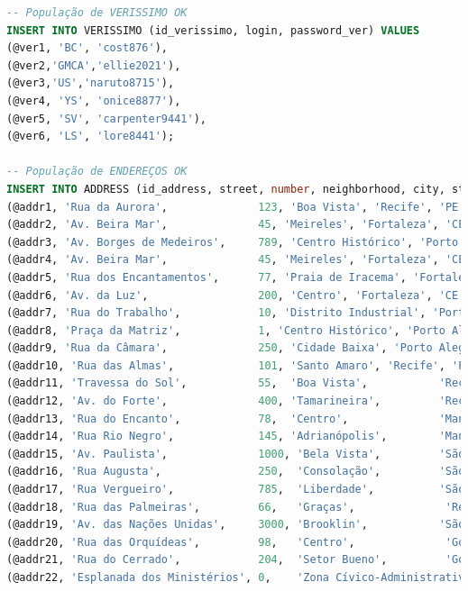 \documentclass[12pt,a4paper]{report}
\begin{document}
\begin{lstlisting}[language=SQL, caption=population.sql]
-- População de VERISSIMO OK
INSERT INTO VERISSIMO (id_verissimo, login, password_ver) VALUES
(@ver1, 'BC', 'cost876'),
(@ver2,'GMCA','ellie2021'),
(@ver3,'US','naruto8715'),
(@ver4, 'YS', 'onice8877'),
(@ver5, 'SV', 'carpenter9441'),
(@ver6, 'LS', 'lore8441');

-- População de ENDEREÇOS OK
INSERT INTO ADDRESS (id_address, street, number, neighborhood, city, state, postal_code) VALUES
(@addr1, 'Rua da Aurora',              123, 'Boa Vista', 'Recife', 'PE', '50060-010'),
(@addr2, 'Av. Beira Mar',              45, 'Meireles', 'Fortaleza', 'CE', '60165-120'),
(@addr3, 'Av. Borges de Medeiros',     789, 'Centro Histórico', 'Porto Alegre', 'RS', '90020-025'),
(@addr4, 'Av. Beira Mar',              45, 'Meireles', 'Fortaleza', 'CE', '60165-120'),
(@addr5, 'Rua dos Encantamentos',      77, 'Praia de Iracema', 'Fortaleza', 'CE', '60060-610'),
(@addr6, 'Av. da Luz',                 200, 'Centro', 'Fortaleza', 'CE', '60020-000'),
(@addr7, 'Rua do Trabalho',            10, 'Distrito Industrial', 'Porto Alegre', 'RS', '90010-000'),
(@addr8, 'Praça da Matriz',            1, 'Centro Histórico', 'Porto Alegre', 'RS', '90020-000'),
(@addr9, 'Rua da Câmara',              250, 'Cidade Baixa', 'Porto Alegre', 'RS', '90030-000'),
(@addr10, 'Rua das Almas',             101, 'Santo Amaro', 'Recife', 'PE', '50040-000'),
(@addr11, 'Travessa do Sol',           55,  'Boa Vista',           'Recife',        'PE', '50050-000'),
(@addr12, 'Av. do Forte',              400, 'Tamarineira',         'Recife',        'PE', '52050-000'),
(@addr13, 'Rua do Encanto',            78,  'Centro',              'Manaus',        'AM', '69010-000'),
(@addr14, 'Rua Rio Negro',             145, 'Adrianópolis',        'Manaus',        'AM', '69057-080'),
(@addr15, 'Av. Paulista',              1000, 'Bela Vista',         'São Paulo',     'SP', '01310-100'),
(@addr16, 'Rua Augusta',               250,  'Consolação',         'São Paulo',     'SP', '01305-000'),
(@addr17, 'Rua Vergueiro',             785,  'Liberdade',          'São Paulo',     'SP', '01504-001'),
(@addr18, 'Rua das Palmeiras',         66,   'Graças',              'Recife',        'PE', '52011-010'),
(@addr19, 'Av. das Nações Unidas',     3000, 'Brooklin',           'São Paulo',     'SP', '04578-000'),
(@addr20, 'Rua das Orquídeas',         98,   'Centro',              'Goiânia',       'GO', '74020-020'),
(@addr21, 'Rua do Cerrado',            204,  'Setor Bueno',         'Goiânia',       'GO', '74391-170'),
(@addr22, 'Esplanada dos Ministérios', 0,    'Zona Cívico-Administrativa','Brasília','DF','70040-906'),

\end{lstlisting}
\end{document}
